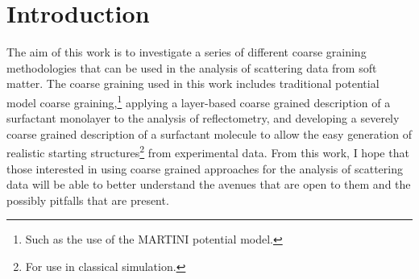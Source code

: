 
\chapter{Introduction} %

\label{introduction} %


The aim of this work is to investigate a series of different coarse graining methodologies that can be used in the analysis of scattering data from soft matter.
The coarse graining used in this work includes traditional potential model coarse graining,\footnote{Such as the use of the MARTINI potential model.} applying a layer-based coarse grained description of a surfactant monolayer to the analysis of reflectometry, and developing a severely coarse grained description of a surfactant molecule to allow the easy generation of realistic starting structures\footnote{For use in classical simulation.} from experimental data.
From this work, I hope that those interested in using coarse grained approaches for the analysis of scattering data will be able to better understand the avenues that are open to them and the possibly pitfalls that are present. 






